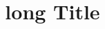 \def\authors{\jules}
\def\longTitle{long Title}
\def\shortTitle{short Title}

\title[\shortTitle]{\longTitle}
\author{\authors}